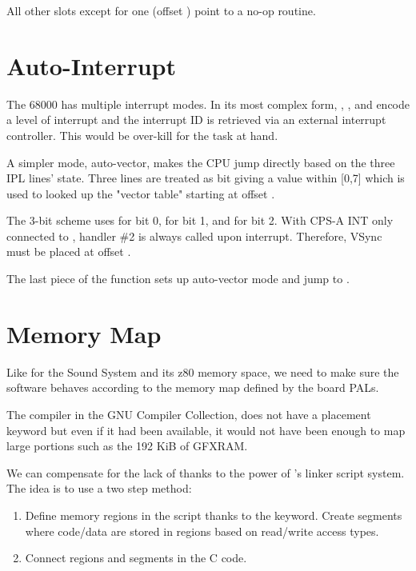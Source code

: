 

All other slots except for one (offset ) point to a no-op routine.




\section{Auto-Interrupt}
The 68000 has multiple interrupt modes. In its most complex form, , , and  encode a level of interrupt and the interrupt ID is retrieved via an external interrupt controller. This would be over-kill for the task at hand.

A simpler mode, auto-vector, makes the CPU jump directly based on the three IPL lines' state. Three lines are treated as bit giving a value within [0,7] which is used to looked up the "vector table" starting at offset .

The 3-bit scheme uses  for bit 0,  for bit 1, and  for bit 2. With CPS-A INT only connected to , handler \#2 is always called upon interrupt. Therefore, VSync must be placed at offset .



The last piece of the  function sets up auto-vector mode and jump to .








\section{Memory Map}
Like for the Sound System and its z80 memory space, we need to make sure the software behaves according to the memory map defined by the board PALs.

The compiler in the GNU Compiler Collection,  does not have a placement keyword  but even if it had been available, it would not have been enough to map large portions such as the 192 KiB of GFXRAM.

We can compensate for the lack of  thanks to the power of 's linker script system. The idea is to use a two step method:
\begin{enumerate}
\item Define memory regions in the script thanks to the  keyword. Create segments where code/data are stored in regions based on read/write access types.
\item Connect regions and segments in the C code.
\end{enumerate}


